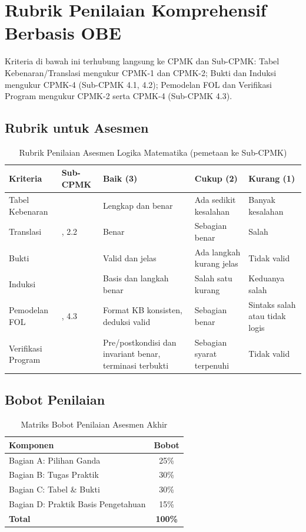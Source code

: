 \section{Rubrik Penilaian Komprehensif Berbasis OBE}

Kriteria di bawah ini terhubung langsung ke CPMK dan Sub-CPMK: Tabel Kebenaran/Translasi mengukur CPMK-1 dan CPMK-2; Bukti dan Induksi mengukur CPMK-4 (Sub-CPMK 4.1, 4.2); Pemodelan FOL dan Verifikasi Program mengukur CPMK-2 serta CPMK-4 (Sub-CPMK 4.3).

\subsection{Rubrik untuk Asesmen}

\begin{table}[H]
\centering
\small
\begin{tabular}{|>{\raggedright\arraybackslash}p{2.2cm}|>{\raggedright\arraybackslash}p{2.2cm}|>{\raggedright\arraybackslash}p{2.8cm}|>{\raggedright\arraybackslash}p{2.8cm}|>{\raggedright\arraybackslash}p{2.2cm}|}
\hline
\textbf{Kriteria} & \textbf{Sub-CPMK} & \textbf{Baik (3)} & \textbf{Cukup (2)} & \textbf{Kurang (1)} \\
\hline
Tabel Kebenaran & 1.2 & Lengkap dan benar & Ada sedikit kesalahan & Banyak kesalahan \\
\hline
Translasi & 2.1, 2.2 & Benar & Sebagian benar & Salah \\
\hline
Bukti & 4.1 & Valid dan jelas & Ada langkah kurang jelas & Tidak valid \\
\hline
Induksi & 4.2 & Basis dan langkah benar & Salah satu kurang & Keduanya salah \\
\hline
Pemodelan FOL & 2.3, 4.3 & Format KB konsisten, deduksi valid & Sebagian benar & Sintaks salah atau tidak logis \\
\hline
Verifikasi Program & 4.3 & Pre/postkondisi dan invariant benar, terminasi terbukti & Sebagian syarat terpenuhi & Tidak valid \\
\hline
\end{tabular}
\caption{Rubrik Penilaian Asesmen Logika Matematika (pemetaan ke Sub-CPMK)}
\end{table}

\subsection{Bobot Penilaian}

\begin{table}[H]
\centering
\begin{tabular}{|l|c|}
\hline
\textbf{Komponen} & \textbf{Bobot} \\
\hline
Bagian A: Pilihan Ganda & 25\% \\
\hline
Bagian B: Tugas Praktik & 30\% \\
\hline
Bagian C: Tabel \& Bukti & 30\% \\
\hline
Bagian D: Praktik Basis Pengetahuan & 15\% \\
\hline
\textbf{Total} & \textbf{100\%} \\
\hline
\end{tabular}
\caption{Matriks Bobot Penilaian Asesmen Akhir}
\end{table}
